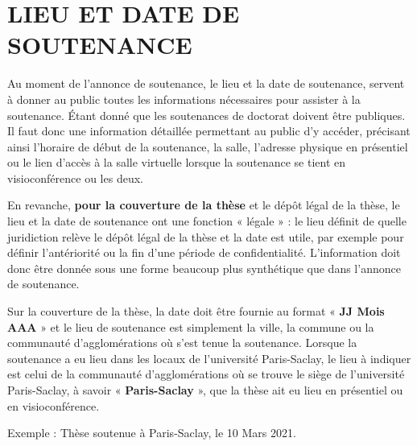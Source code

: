 \documentclass[french,12pt,a4paper]{book}
\begin{document}
\section{LIEU ET DATE DE SOUTENANCE}
Au moment de l’annonce de soutenance, le lieu et la date de soutenance, servent à donner au public toutes les informations nécessaires pour assister à la soutenance. Étant donné que les soutenances de doctorat doivent être publiques. Il faut donc une information détaillée permettant au public d’y accéder, précisant ainsi l’horaire de début de la soutenance, la salle, l’adresse physique en présentiel ou le lien d’accès à la salle virtuelle lorsque la soutenance se tient en visioconférence ou les deux.\\ \par
En revanche, \textbf{pour la couverture de la thèse} et le dépôt légal de la thèse, le lieu et la date de soutenance ont une fonction « légale » : le lieu définit de quelle juridiction relève le dépôt légal de la thèse et la date est utile, par exemple pour définir l’antériorité ou la fin d’une période de confidentialité. L’information doit donc être donnée sous une forme beaucoup plus synthétique que dans l’annonce de soutenance.\\ \par
Sur la couverture de la thèse, la date doit être fournie au format « \textbf{JJ Mois AAA} » et le lieu de soutenance est simplement la ville, la commune ou la communauté d’agglomérations où s’est tenue la soutenance. Lorsque la soutenance a eu lieu dans les locaux de l’université Paris-Saclay, le lieu à indiquer est celui de la communauté d’agglomérations où se trouve le siège de l’université Paris-Saclay, à savoir « \textbf{Paris-Saclay} », que la thèse ait eu lieu en présentiel ou en visioconférence.\\ \par
Exemple : Thèse soutenue à Paris-Saclay,  le 10 Mars 2021.
\end{document}
